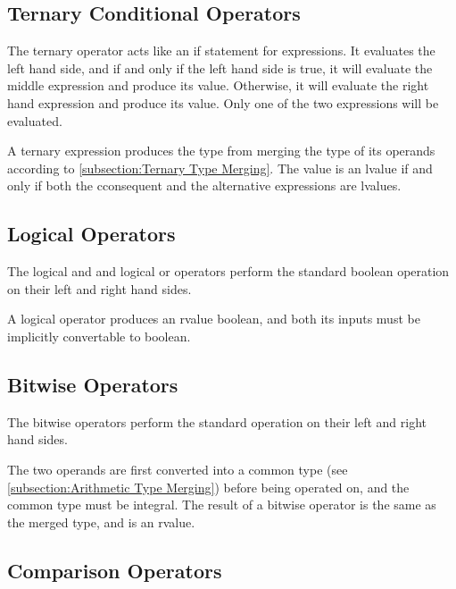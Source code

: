 \documentclass[letterpaper,12pt]{book}
\begin{document}
\subsection{Ternary Conditional Operators}



The ternary operator acts like an if statement for expressions. It evaluates the left hand side, and if and only if the left hand side is true, it will evaluate the middle expression and produce its value. Otherwise, it will evaluate the right hand expression and produce its value. Only one of the two expressions will be evaluated.

A ternary expression produces the type from merging the type of its operands according to \ref{subsection:Ternary Type Merging}. The value is an lvalue if and only if both the cconsequent and the alternative expressions are lvalues.

\subsection{Logical Operators}



The logical and and logical or operators perform the standard boolean operation on their left and right hand sides.

A logical operator produces an rvalue boolean, and both its inputs must be implicitly convertable to boolean.

\subsection{Bitwise Operators}



The bitwise operators perform the standard operation on their left and right hand sides.

The two operands are first converted into a common type (see \ref{subsection:Arithmetic Type Merging}) before being operated on, and the common type must be integral. The result of a bitwise operator is the same as the merged type, and is an rvalue.

\subsection{Comparison Operators}
\end{document}
